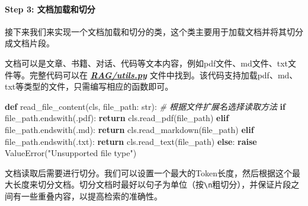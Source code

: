 \documentclass[
]{article}
\newenvironment{Shaded}{}{}
\newcommand{\BuiltInTok}[1]{\textcolor[rgb]{0.00,0.50,0.00}{#1}}
\newcommand{\CommentTok}[1]{\textcolor[rgb]{0.38,0.63,0.69}{\textit{#1}}}
\newcommand{\ControlFlowTok}[1]{\textcolor[rgb]{0.00,0.44,0.13}{\textbf{#1}}}
\newcommand{\KeywordTok}[1]{\textcolor[rgb]{0.00,0.44,0.13}{\textbf{#1}}}
\newcommand{\NormalTok}[1]{#1}
\newcommand{\PreprocessorTok}[1]{\textcolor[rgb]{0.74,0.48,0.00}{#1}}
\newcommand{\StringTok}[1]{\textcolor[rgb]{0.25,0.44,0.63}{#1}}
\begin{document}
\paragraph{Step 3:
文档加载和切分}\label{step-3-ux6587ux6863ux52a0ux8f7dux548cux5207ux5206}

接下来我们来实现一个文档加载和切分的类，这个类主要用于加载文档并将其切分成文档片段。

文档可以是文章、书籍、对话、代码等文本内容，例如pdf文件、md文件、txt文件等。完整代码可以在
\textbf{\emph{\href{./RAG/utils.py}{RAG/utils.py}}}
文件中找到。该代码支持加载pdf、md、txt等类型的文件，只需编写相应的函数即可。

\begin{Shaded}
\begin{Highlighting}[]
\KeywordTok{def}\NormalTok{ read\_file\_content(cls, file\_path: }\BuiltInTok{str}\NormalTok{):}
    \CommentTok{\# 根据文件扩展名选择读取方法}
    \ControlFlowTok{if}\NormalTok{ file\_path.endswith(}\StringTok{\textquotesingle{}.pdf\textquotesingle{}}\NormalTok{):}
        \ControlFlowTok{return}\NormalTok{ cls.read\_pdf(file\_path)}
    \ControlFlowTok{elif}\NormalTok{ file\_path.endswith(}\StringTok{\textquotesingle{}.md\textquotesingle{}}\NormalTok{):}
        \ControlFlowTok{return}\NormalTok{ cls.read\_markdown(file\_path)}
    \ControlFlowTok{elif}\NormalTok{ file\_path.endswith(}\StringTok{\textquotesingle{}.txt\textquotesingle{}}\NormalTok{):}
        \ControlFlowTok{return}\NormalTok{ cls.read\_text(file\_path)}
    \ControlFlowTok{else}\NormalTok{:}
        \ControlFlowTok{raise} \PreprocessorTok{ValueError}\NormalTok{(}\StringTok{"Unsupported file type"}\NormalTok{)}
\end{Highlighting}
\end{Shaded}

文档读取后需要进行切分。我们可以设置一个最大的Token长度，然后根据这个最大长度来切分文档。切分文档时最好以句子为单位（按\texttt{\textbackslash{}n}粗切分），并保证片段之间有一些重叠内容，以提高检索的准确性。
\end{document}

